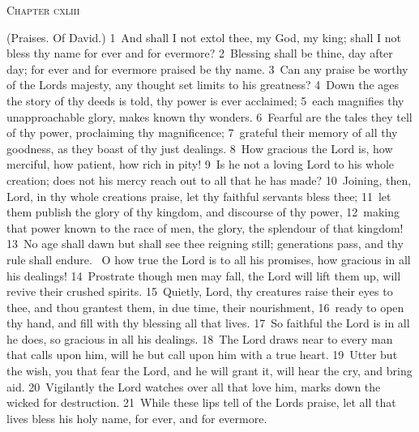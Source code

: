 \documentclass[10pt]{book} %
\begin{document}
\begin{large}\begin{center}\textsc{Chapter cxliii}\end{center}\end{large}
(Praises. Of David.)
\textcolor{benred8}{1}~And shall I not extol thee, my God, my king; shall I not bless thy name for ever and for evermore? \textcolor{benred8}{2}~Blessing shall be thine, day after day; for ever and for evermore praised be thy name. \textcolor{benred8}{3}~Can any praise be worthy of the Lord\textquotesingle s majesty, any thought set limits to his greatness? \textcolor{benred8}{4}~Down the ages the story of thy deeds is told, thy power is ever acclaimed; \textcolor{benred8}{5}~each magnifies thy unapproachable glory, makes known thy wonders. \textcolor{benred8}{6}~Fearful are the tales they tell of thy power, proclaiming thy magnificence; \textcolor{benred8}{7}~grateful their memory of all thy goodness, as they boast of thy just dealings. \textcolor{benred8}{8}~How gracious the Lord is, how merciful, how patient, how rich in pity! \textcolor{benred8}{9}~Is he not a loving Lord to his whole creation; does not his mercy reach out to all that he has made?
\textcolor{benred8}{10}~Joining, then, Lord, in thy whole creation\textquotesingle s praise, let thy faithful servants bless thee; \textcolor{benred8}{11}~let them publish the glory of thy kingdom, and discourse of thy power, \textcolor{benred8}{12}~making that power known to the race of men, the glory, the splendour of that kingdom! \textcolor{benred8}{13}~No age shall dawn but shall see thee reigning still; generations pass, and thy rule shall endure. ~O how true the Lord is to all his promises, how gracious in all his dealings! \textcolor{benred8}{14}~Prostrate though men may fall, the Lord will lift them up, will revive their crushed spirits.
\textcolor{benred8}{15}~Quietly, Lord, thy creatures raise their eyes to thee, and thou grantest them, in due time, their nourishment, \textcolor{benred8}{16}~ready to open thy hand, and fill with thy blessing all that lives. \textcolor{benred8}{17}~So faithful the Lord is in all he does, so gracious in all his dealings. \textcolor{benred8}{18}~The Lord draws near to every man that calls upon him, will he but call upon him with a true heart. \textcolor{benred8}{19}~Utter but the wish, you that fear the Lord, and he will grant it, will hear the cry, and bring aid. \textcolor{benred8}{20}~Vigilantly the Lord watches over all that love him, marks down the wicked for destruction. \textcolor{benred8}{21}~While these lips tell of the Lord\textquotesingle s praise, let all that lives bless his holy name, for ever, and for evermore.
\end{document}
